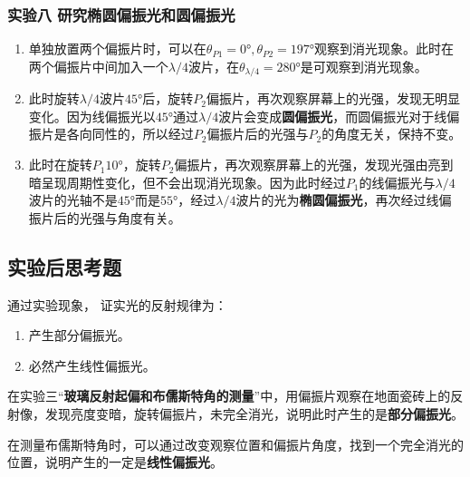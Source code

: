 \documentclass[dvipsnames, svgnames,a4paper,11pt]{article}
\begin{document}
	\subsubsection{实验八 \quad 研究椭圆偏振光和圆偏振光}

	\begin{enumerate}
		\item 单独放置两个偏振片时，可以在$\theta_{P1}=\ang{0},\theta_{P2}=\ang{197}$观察到消光现象。此时在两个偏振片中间加入一个$\lambda/4$波片，在$\theta_{\lambda/4}=\ang{280}$是可观察到消光现象。	
		\item 此时旋转$\lambda/4$波片$\ang{45}$后，旋转$P_2$偏振片，再次观察屏幕上的光强，发现无明显变化。因为线偏振光以$\ang{45}$通过$\lambda/4$波片会变成\textbf{圆偏振光}，而圆偏振光对于线偏振片是各向同性的，所以经过$P_2$偏振片后的光强与$P_2$的角度无关，保持不变。
		\item 此时在旋转$P_1\ang{10}$，旋转$P_2$偏振片，再次观察屏幕上的光强，发现光强由亮到暗呈现周期性变化，但不会出现消光现象。因为此时经过$P_1$的线偏振光与$\lambda/4$波片的光轴不是$\ang{45}$而是$\ang{55}$，经过$\lambda/4$波片的光为\textbf{椭圆偏振光}，再次经过线偏振片后的光强与角度有关。
	\end{enumerate}

	









			
			
\subsection{实验后思考题}

\begin{question}
	通过实验现象， 证实光的反射规律为：
	\begin{enumerate}
		\item 产生部分偏振光。
		\item 必然产生线性偏振光。
	\end{enumerate}

\end{question}

	在实验三“\textbf{玻璃反射起偏和布儒斯特角的测量}”中，用偏振片观察在地面瓷砖上的反射像，发现亮度变暗，旋转偏振片，未完全消光，说明此时产生的是\textbf{部分偏振光}。

	在测量布儒斯特角时，可以通过改变观察位置和偏振片角度，找到一个完全消光的位置，说明产生的一定是\textbf{线性偏振光}。
\end{document}
